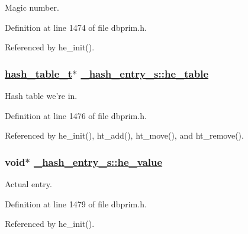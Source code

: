 Magic number. 

Definition at line 1474 of file dbprim.h.

Referenced by he\_\-init().\hypertarget{struct__hash__entry__s_o2}{
\subsubsection[he\_\-table]{\setlength{\rightskip}{0pt plus 5cm}\hyperlink{struct__hash__table__s}{hash\_\-table\_\-t}$\ast$ \hyperlink{struct__hash__entry__s_o2}{\_\-hash\_\-entry\_\-s::he\_\-table}}}
\label{struct__hash__entry__s_o2}


Hash table we're in. 

Definition at line 1476 of file dbprim.h.

Referenced by he\_\-init(), ht\_\-add(), ht\_\-move(), and ht\_\-remove().\hypertarget{struct__hash__entry__s_o5}{
\subsubsection[he\_\-value]{\setlength{\rightskip}{0pt plus 5cm}void$\ast$ \hyperlink{struct__hash__entry__s_o5}{\_\-hash\_\-entry\_\-s::he\_\-value}}}
\label{struct__hash__entry__s_o5}


Actual entry. 

Definition at line 1479 of file dbprim.h.

Referenced by he\_\-init().